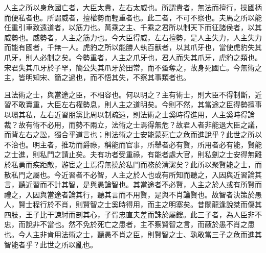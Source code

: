 
\begin{pinyinscope}
人主之所以身危國亡者，大臣太貴，左右太威也。所謂貴者，無法而擅行，操國柄而便私者也。所謂威者，擅權勢而輕重者也。此二者，不可不察也。夫馬之所以能任重引車致遠道者，以筋力也。萬乘之主、千乘之君所以制天下而征諸侯者，以其威勢也。威勢者，人主之筋力也。今大臣得威，左右擅勢，是人主失力，人主失力而能有國者，千無一人。虎豹之所以能勝人執百獸者，以其爪牙也，當使虎豹失其爪牙，則人必制之矣。今勢重者，人主之爪牙也，君人而失其爪牙，虎豹之類也。宋君失其爪牙於子罕，簡公失其爪牙於田常，而不蚤奪之，故身死國亡。今無術之主，皆明知宋、簡之過也，而不悟其失，不察其事類者也。

且法術之士，與當途之臣，不相容也。何以明之？主有術士，則大臣不得制斷，近習不敢賣重，大臣左右權勢息，則人主之道明矣。今則不然，其當途之臣得勢擅事以環其私，左右近習朋黨比周以制疏遠，則法術之士奚時得進用，人主奚時得論裁？故有術不必用，而勢不兩立，法術之士焉得無危？故君人者非能退大臣之議，而背左右之訟，獨合乎道言也；則法術之士安能蒙死亡之危而進說乎？此世之所以不治也。明主者，推功而爵祿，稱能而官事，所舉者必有賢，所用者必有能，賢能之士進，則私門之請止矣。夫有功者受重祿，有能者處大官，則私劍之士安得無離於私勇而疾距敵，游宦之士焉得無撓於私門而務於清潔矣？此所以聚賢能之士，而散私門之屬也。今近習者不必智，人主之於人也或有所知而聽之，入因與近習論其言，聽近習而不計其智，是與愚論智也。其當途者不必賢，人主之於人或有所賢而禮之，入因與當途者論其行，聽其言而不用賢，是與不肖論賢也。故智者決策於愚人，賢士程行於不肖，則賢智之士奚時得用，而主之明塞矣。昔關龍逢說桀而傷其四肢，王子比干諫紂而剖其心，子胥忠直夫差而誅於屬鏤。此三子者，為人臣非不忠，而說非不當也。然不免於死亡之患者，主不察賢智之言，而蔽於愚不肖之患也。今人主非肯用法術之士，聽愚不肖之臣，則賢智之士、孰敢當三子之危而進其智能者乎？此世之所以亂也。


\end{pinyinscope}
